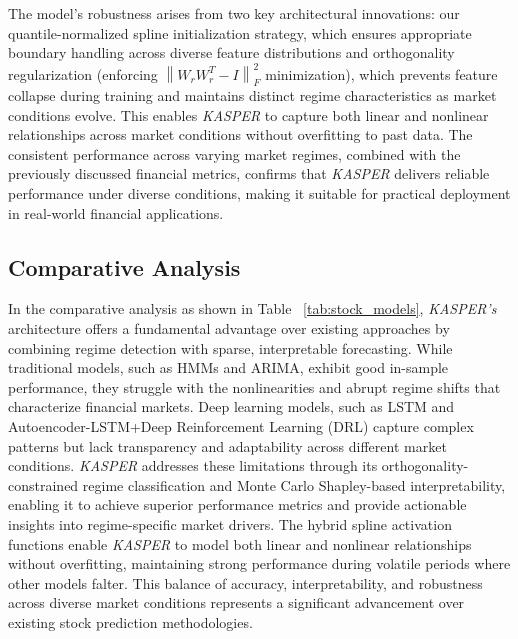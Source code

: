 \documentclass[conference,10pt]{IEEEtran}
\begin{document}
The model's robustness arises from two key architectural innovations: our quantile-normalized spline initialization strategy, which ensures appropriate boundary handling across diverse feature distributions and orthogonality regularization (enforcing \( \left\lVert W_r W_r^T - I \right\rVert^2_F \) minimization), which prevents feature collapse during training and maintains distinct regime characteristics as market conditions evolve. This enables \textit{KASPER} to capture both linear and nonlinear relationships across market conditions without overfitting to past data. The consistent performance across varying market regimes, combined with the previously discussed financial metrics, confirms that \textit{KASPER} delivers reliable performance under diverse conditions, making it suitable for practical deployment in real-world financial applications.

\subsection{Comparative Analysis} 

In the comparative analysis as shown in Table ~\ref{tab:stock_models}, \textit{KASPER's} architecture offers a fundamental advantage over existing approaches by combining regime detection with sparse, interpretable forecasting. While traditional models, such as HMMs and ARIMA, exhibit good in-sample performance, they struggle with the nonlinearities and abrupt regime shifts that characterize financial markets. Deep learning models, such as LSTM and Autoencoder-LSTM+Deep Reinforcement Learning (DRL) capture complex patterns but lack transparency and adaptability across different market conditions. \textit{KASPER} addresses these limitations through its orthogonality-constrained regime classification and Monte Carlo Shapley-based interpretability, enabling it to achieve superior performance metrics and provide actionable insights into regime-specific market drivers. The hybrid spline activation functions enable \textit{KASPER} to model both linear and nonlinear relationships without overfitting, maintaining strong performance during volatile periods where other models falter. This balance of accuracy, interpretability, and robustness across diverse market conditions represents a significant advancement over existing stock prediction methodologies.
\end{document}
